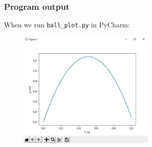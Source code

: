 \documentclass[14pt]{beamer}
\begin{document}

\begin{frame}[fragile]
\frametitle{Program output}
When we run \texttt{ball\_plot.py} in PyCharm:
\begin{figure}[ht]
	\centering
	\includegraphics[width=0.6\textwidth]{figures/LLp20output}
\end{figure}

\end{frame}

\end{document}
